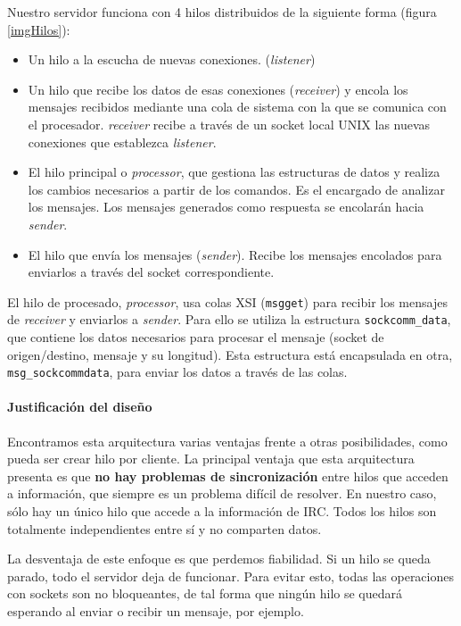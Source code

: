 \documentclass{article}
\begin{document}
Nuestro servidor funciona con 4 hilos distribuidos de la siguiente forma (figura \ref{imgHilos}):
\begin{itemize}
\item  Un hilo a la escucha de nuevas conexiones. (\emph{listener})
\item Un hilo que recibe los datos de esas conexiones (\emph{receiver}) y encola los mensajes recibidos mediante una cola de sistema con la que se comunica con el procesador. \textit{receiver} recibe a través de un socket local UNIX las nuevas conexiones que establezca \textit{listener}.
\item El hilo principal o \textit{processor}, que gestiona las estructuras de datos y realiza los cambios necesarios a partir de los comandos. Es el encargado de analizar los mensajes. Los mensajes generados como respuesta se encolarán hacia \textit{sender}.
\item El hilo que envía los mensajes (\emph{sender}). Recibe los mensajes encolados para enviarlos a través del socket correspondiente.
\end{itemize}

El hilo de procesado, \textit{processor}, usa colas XSI (\texttt{msgget}) para recibir los mensajes de \textit{receiver} y enviarlos a \textit{sender}. Para ello se utiliza la estructura \texttt{sockcomm\_data}, que contiene los datos necesarios para procesar el mensaje (socket de origen/destino, mensaje y su longitud). Esta estructura está encapsulada en otra, \texttt{msg\_sockcommdata}, para enviar los datos a través de las colas.

\paragraph{Justificación del diseño}

Encontramos esta arquitectura varias ventajas frente a otras posibilidades, como pueda ser crear hilo por cliente. La principal ventaja que esta arquitectura presenta es que \textbf{no hay problemas de sincronización} entre hilos que acceden a información, que siempre es un problema difícil de resolver. En nuestro caso, sólo hay un único hilo que accede a la información de IRC. Todos los hilos son totalmente independientes entre sí y no comparten datos.

La desventaja de este enfoque es que perdemos fiabilidad. Si un hilo se queda parado, todo el servidor deja de funcionar. Para evitar esto, todas las operaciones con sockets son no bloqueantes, de tal forma que ningún hilo se quedará esperando al enviar o recibir un mensaje, por ejemplo.
\end{document}
